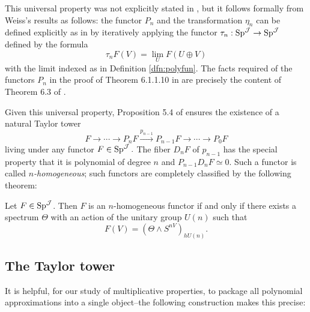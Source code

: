 \begin{rmk}\label{rmk:infinityweiss}
This universal property was not explicitly stated in \cite{Weiss}, but it follows formally from Weiss's results as follows: the functor $P_n$ and the transformation $\eta_n$ can be defined explicitly as in \cite{Weiss} by iteratively applying the functor $\tau_n: \operatorname{\mathrm{Sp}}^{\operatorname{\mathcal{J}}} \to \operatorname{\mathrm{Sp}}^{\operatorname{\mathcal{J}}}$ defined by the formula $$\tau_n F(V) = \lim_U F(U\oplus V)$$ with the limit indexed as in Definition \ref{dfn:polyfun}.   The facts required of the functors $P_n$ in the proof of Theorem 6.1.1.10 in \cite{HA} are precisely the content of Theorem 6.3 of \cite{Weiss}.  
\end{rmk}

Given this universal property, Proposition 5.4 of \cite{Weiss} ensures the existence of a natural Taylor tower $$F \longrightarrow \cdots \longrightarrow P_{n} F \xrightarrow{p_{n-1}} P_{n-1} F \longrightarrow \cdots \longrightarrow P_0F$$ living under any functor $F\in \operatorname{\mathrm{Sp}}^{\operatorname{\mathcal{J}}}.$  The fiber $D_n F$ of $p_{n-1}$ has the special property that it is polynomial of degree $n$ and $P_{n-1} D_n F \simeq 0$.  Such a functor is called \emph{$n$-homogeneous}; such functors are completely classified by the following theorem:

\begin{thm}
Let $F\in \operatorname{\mathrm{Sp}}^{\operatorname{\mathcal{J}}}$.  Then $F$ is an $n$-homogeneous functor if and only if there exists a spectrum $\Theta$ with an action of the unitary group $U(n)$ such that $$F(V) = (\Theta \wedge S^{nV})_{hU(n)}.$$
\end{thm}


\subsection{The Taylor tower}

It is helpful, for our study of multiplicative properties, to package all polynomial approximations into a single object--the following construction makes this precise:


